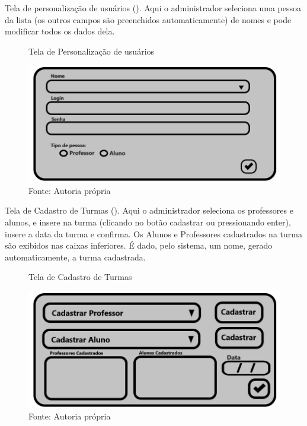 \documentclass{utfpr-pg}
\begin{document}
        Tela de personalização de usuários (). Aqui o administrador seleciona uma pessoa da lista (os outros campos são preenchidos automaticamente) de nomes e pode modificar todos os dados dela.
        \begin{figure}[H]
            \centering
            \captionsetup{width=0.9\textwidth}
            \caption{Tela de Personalização de usuários}
            \includegraphics[width=\linewidth]{fotos/13.2.jpg}
            \caption*{Fonte: Autoria própria}
            \label{fig:13.2}
        \end{figure}
        
        Tela de Cadastro de Turmas (). Aqui o administrador seleciona os professores e alunos, e insere na turma (clicando no botão cadastrar ou pressionando enter), insere a data da turma e confirma. Os Alunos e Professores cadastrados na turma são exibidos nas caixas inferiores. É dado, pelo sistema, um nome, gerado automaticamente, a turma cadastrada.
        
        \begin{figure}[H]
            \centering
            \captionsetup{width=0.9\textwidth}
            \caption{Tela de Cadastro de Turmas}
            \includegraphics[width=\linewidth]{fotos/14.jpg}
            \caption*{Fonte: Autoria própria}
            \label{fig:14}
        \end{figure}
        
\end{document}
